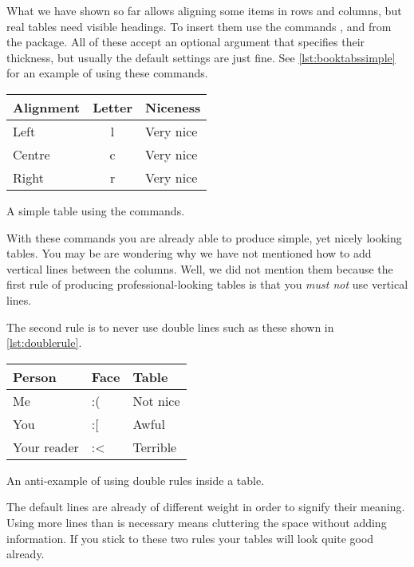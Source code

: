 What we have shown so far allows aligning some items in rows and columns,
but real tables need visible headings. To insert them use the commands
,  and  from the  package.
All of these accept an optional argument that specifies their thickness, but
usually the default settings are just fine. See
\autoref{lst:booktabssimple} for an example of using these commands.
\begin{listing}
  \begin{example}[examplewidth=0.6\linewidth, vertical_mode]
\begin{tabular}{lcl}
  \toprule
  Alignment & Letter & Niceness  \\
  \midrule
  Left      & l      & Very nice \\
  Centre    & c      & Very nice \\
  Right     & r      & Very nice \\
  \bottomrule
\end{tabular}
\end{example}
  \caption{A simple table using the  commands.}\label{lst:booktabssimple}
\end{listing}

With these commands you are already able to produce simple, yet nicely looking
tables. You may be are wondering why we have not mentioned how to add vertical
lines between the columns. Well, we did not mention them because the first rule
of producing professional-looking tables is that you \emph{must not} use
vertical lines.

The second rule is to never use double lines such as these shown in
\autoref{lst:doublerule}.
\begin{listing}
  \begin{chktexignore}
  \begin{example}[examplewidth=0.6\linewidth, vertical_mode]
\begin{tabular}{lll}
  \toprule[0.1cm]
  \toprule
  Person      & Face & Table    \\
  \midrule
  \midrule
  Me          & :(   & Not nice \\
  You         & :[   & Awful    \\
  Your reader & :<   & Terrible \\
  \bottomrule
  \bottomrule[0.1cm]
\end{tabular}
\end{example}
\end{chktexignore}
  \caption{An anti-example of using double rules inside a table.}\label{lst:doublerule}
\end{listing}
The default lines are already of different weight in order to signify
their meaning. Using more lines than is necessary means cluttering the space
without adding information. If you stick to these two rules your tables will
look quite good already.

